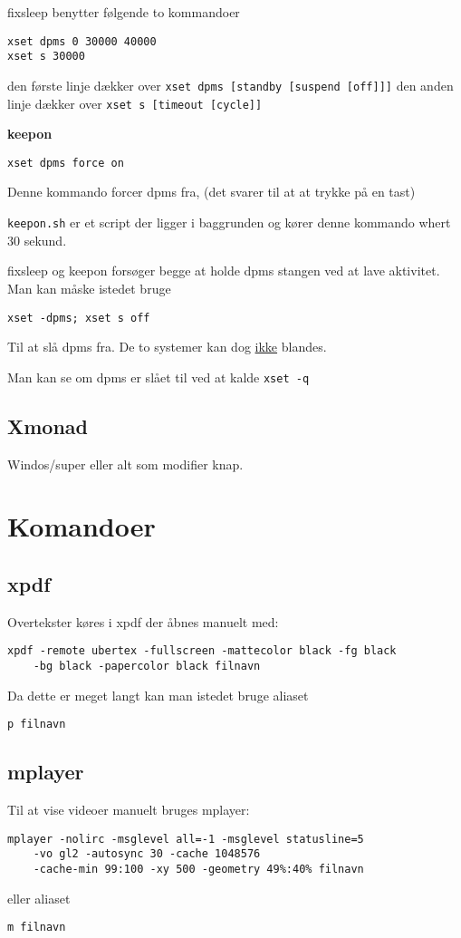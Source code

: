 \documentclass[10pt,a4paper,danish]{article}
\begin{document}
fixsleep benytter følgende to kommandoer
\begin{verbatim}
xset dpms 0 30000 40000
xset s 30000
\end{verbatim}
den første linje dækker over \texttt{xset dpms [standby [suspend [off]]]}
den anden linje dækker over \texttt{xset s [timeout [cycle]]}

\textbf{keepon}
\begin{verbatim}
xset dpms force on
\end{verbatim}
Denne kommando forcer dpms fra, (det svarer til at at trykke på en tast)

\texttt{keepon.sh} er et script der ligger i baggrunden og kører denne kommando
whert 30 sekund.


fixsleep og keepon forsøger begge at holde dpms stangen ved at lave aktivitet.
Man kan måske istedet bruge
\begin{verbatim}
xset -dpms; xset s off
\end{verbatim}
Til at slå dpms fra.
De to systemer kan dog \uline{ikke} blandes.

Man kan se om dpms er slået til ved at kalde \texttt{xset -q}
\subsection{Xmonad}
Windos/super eller alt som modifier knap.

\section{Komandoer}

\subsection{xpdf}
Overtekster køres i xpdf der åbnes manuelt med:
\begin{verbatim}
xpdf -remote ubertex -fullscreen -mattecolor black -fg black
    -bg black -papercolor black filnavn
\end{verbatim}
Da dette er meget langt kan man istedet bruge aliaset
\begin{verbatim}
p filnavn
\end{verbatim}


\subsection{mplayer}
Til at vise videoer manuelt bruges mplayer:
\begin{verbatim}
mplayer -nolirc -msglevel all=-1 -msglevel statusline=5
    -vo gl2 -autosync 30 -cache 1048576
    -cache-min 99:100 -xy 500 -geometry 49%:40% filnavn
\end{verbatim}
eller aliaset
\begin{verbatim}
m filnavn
\end{verbatim}
\end{document}
